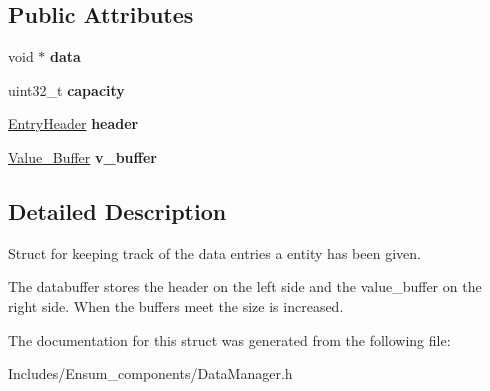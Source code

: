 \subsection*{Public Attributes}
\begin{DoxyCompactItemize}
\item 
void $\ast$ {\bfseries data}\hypertarget{struct_ensum_1_1_components_1_1_data_manager_1_1_data_buffer_a9297555e082ec773d4e49060df1c6a91}{}\label{struct_ensum_1_1_components_1_1_data_manager_1_1_data_buffer_a9297555e082ec773d4e49060df1c6a91}

\item 
uint32\+\_\+t {\bfseries capacity}\hypertarget{struct_ensum_1_1_components_1_1_data_manager_1_1_data_buffer_a11b7c9123c55ad06806011412b6617f4}{}\label{struct_ensum_1_1_components_1_1_data_manager_1_1_data_buffer_a11b7c9123c55ad06806011412b6617f4}

\item 
\hyperlink{struct_ensum_1_1_components_1_1_data_manager_1_1_entry_header}{Entry\+Header} {\bfseries header}\hypertarget{struct_ensum_1_1_components_1_1_data_manager_1_1_data_buffer_a49547b879ac0083ade12a7488c1b74d9}{}\label{struct_ensum_1_1_components_1_1_data_manager_1_1_data_buffer_a49547b879ac0083ade12a7488c1b74d9}

\item 
\hyperlink{struct_ensum_1_1_components_1_1_data_manager_1_1_value___buffer}{Value\+\_\+\+Buffer} {\bfseries v\+\_\+buffer}\hypertarget{struct_ensum_1_1_components_1_1_data_manager_1_1_data_buffer_a08464c56ea3a4a5fc34b3cb87534fbe0}{}\label{struct_ensum_1_1_components_1_1_data_manager_1_1_data_buffer_a08464c56ea3a4a5fc34b3cb87534fbe0}

\end{DoxyCompactItemize}


\subsection{Detailed Description}
Struct for keeping track of the data entries a entity has been given. 

The databuffer stores the header on the left side and the value\+\_\+buffer on the right side. When the buffers meet the size is increased. 

The documentation for this struct was generated from the following file\+:\begin{DoxyCompactItemize}
\item 
Includes/\+Ensum\+\_\+components/Data\+Manager.\+h\end{DoxyCompactItemize}
